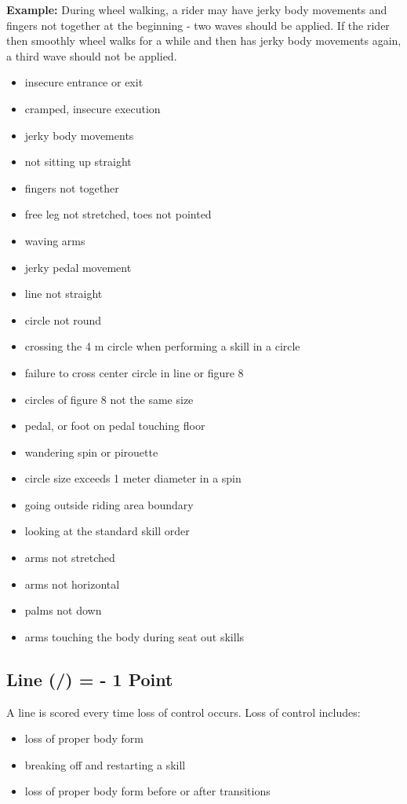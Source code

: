\textbf{Example:} During wheel walking, a rider may have jerky body movements and fingers not together at the beginning - two waves should be applied.
If the rider then smoothly wheel walks for a while and then has jerky body movements again, a third wave should not be applied.
\begin{itemize}
\item insecure entrance or exit 
\item cramped, insecure execution 
\item jerky body movements 
\item not sitting up straight 
\item fingers not together 
\item free leg not stretched, toes not pointed 
\item waving arms 
\item jerky pedal movement 
\item line not straight 
\item circle not round 
\item crossing the 4 m circle when performing a skill in a circle 
\item failure to cross center circle in line or figure 8 
\item circles of figure 8 not the same size 
\item pedal, or foot on pedal touching floor 
\item wandering spin or pirouette 
\item circle size exceeds 1 meter diameter in a spin 
\item going outside riding area boundary 
\item looking at the standard skill order 
\item arms not stretched 
\item arms not horizontal 
\item palms not down 
\item arms touching the body during seat out skills
\end{itemize}

\subsection{Line (/) = - 1 Point}
A line is scored every time loss of control occurs.
Loss of control includes:
\begin{itemize}
\item loss of proper body form 
\item breaking off and restarting a skill 
\item loss of proper body form before or after transitions
\end{itemize}

